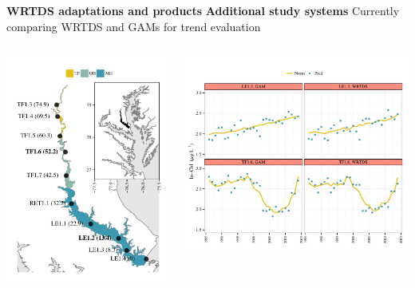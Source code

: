 \documentclass[serif]{beamer}\usepackage[]{graphicx}\usepackage[]{color}
\begin{document}
\begin{frame}{\textbf{WRTDS adaptations and products}}{\textbf{ Additional study systems}}
Currently comparing WRTDS and GAMs for trend evaluation
\begin{columns}
\begin{column}{0.38\textwidth}
\includegraphics[width = \textwidth]{fig/patux_map.pdf}
\end{column}
\begin{column}{0.65\textwidth}
\includegraphics[width = \textwidth]{fig/predann.pdf}

\end{column}
\end{columns}
\end{frame}
\end{document}
